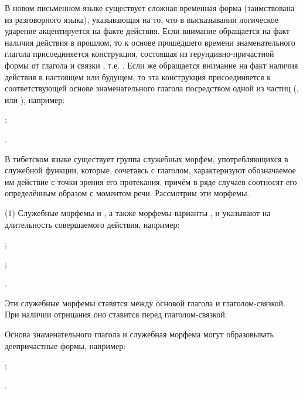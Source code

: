 В новом письменном языке существует сложная временная форма (заимствована из разговорного языка), указывающая на то, что в высказывании логическое ударение акцентируется на факте действия. Если внимание обращается на факт наличия действия в прошлом, то к основе прошедшего времени знаменательного глагола присоединяется конструкция, состоящая из герундивно-причастной формы от глагола  и связки , т.е. . Если же обращается внимание на факт наличия действия в настоящем или будущем, то эта конструкция присоединяется к соответствующей основе знаменательного глагола посредством одной из частиц (,  или ), например:
\begin{prfsample}
	\item {};
	\item {}.
\end{prfsample}

В тибетском языке существует группа служебных морфем, употребляющихся в служебной функции, которые, сочетаясь с глаголом, характеризуют обозначаемое им действие с точки зрения его протекания, причём в ряде случаев соотносят его определённым образом с моментом речи. Рассмотрим эти морфемы.

(1)	Служебные морфемы  и , а также морфемы-варианты ,  и  указывают на длительность совершаемого действия, например:
\begin{prfsample}
	\item {};
	\item {};
	\item {}.
\end{prfsample}
Эти служебные морфемы ставятся между основой глагола и глаголом-связкой. При наличии отрицания оно ставится перед глаголом-связкой.

Основа знаменательного глагола и служебная морфема  могут образовывать деепричастные формы, например:
\begin{prfsample}
	\item {};
	\item {}.
\end{prfsample}

